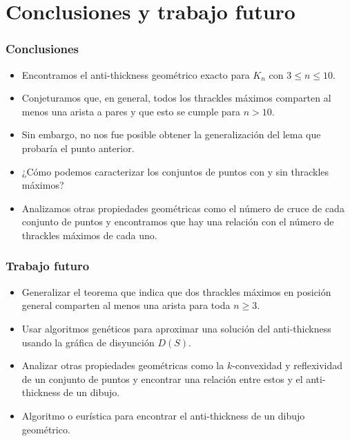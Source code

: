 \section{Conclusiones y trabajo futuro}
\begin{frame}
\frametitle{Conclusiones}
\begin{itemize}
	\item Encontramos el anti-thickness geométrico exacto para $K_n$ con $3 \leq n \leq 10$.
	\item Conjeturamos que, en general, todos los thrackles máximos comparten al menos una arista a pares y que esto se cumple para $n > 10$.
	\item Sin embargo, no nos fue posible obtener la generalización del lema que probaría el punto anterior.
	\item ¿Cómo podemos caracterizar los conjuntos de puntos con y sin thrackles máximos?
	\item Analizamos otras propiedades geométricas como el número de cruce de cada conjunto de puntos y encontramos que hay una relación con el número de thrackles máximos de cada uno.
\end{itemize}
\end{frame}

\begin{frame}
\frametitle{Trabajo futuro}
\begin{itemize}
	\item Generalizar el teorema que indica que dos thrackles máximos en posición general comparten al menos una arista para toda $n \geq 3$.
	\item Usar algoritmos genéticos para aproximar una solución del anti-thickness usando la gráfica de disyunción $D(S)$.
	\item Analizar otras propiedades geométricas como la $k$-convexidad y reflexividad de un conjunto de puntos y encontrar una relación entre estos y el anti-thickness de un dibujo.
	\item Algoritmo o eurística para encontrar el anti-thickness de un dibujo geométrico.
\end{itemize}
\end{frame}